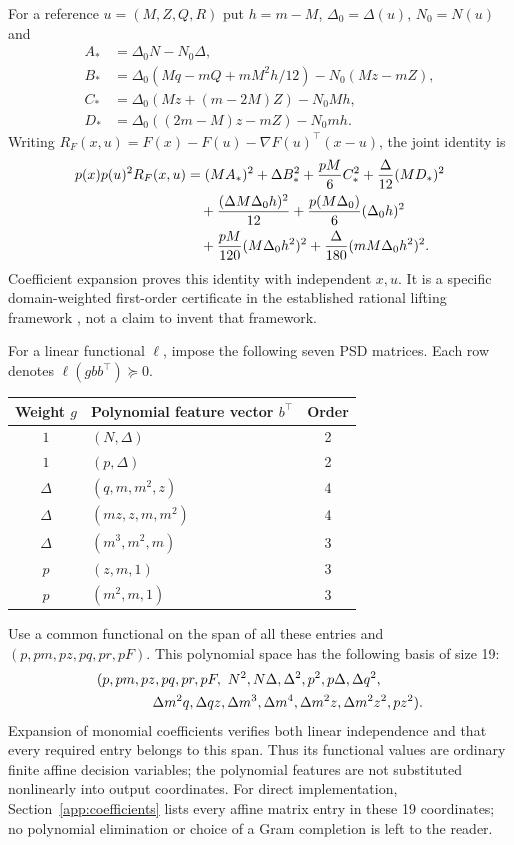 \documentclass[pdflatex,sn-mathphys-num]{sn-jnl}
\theoremstyle{thmstyleone}
\theoremstyle{thmstyletwo}\newtheorem{remark}[theorem]{Remark}
\begin{document}
For a reference $u=(M,Z,Q,R)$ put $h=m-M$, $\Delta_0=\Delta(u)$,
$N_0=N(u)$ and
\begin{align*}
 A_*&=\Delta_0N-N_0\Delta,\\
 B_*&=\Delta_0(Mq-mQ+mM^2h/12)-N_0(Mz-mZ),\\
 C_*&=\Delta_0(Mz+(m-2M)Z)-N_0Mh,\\
 D_*&=\Delta_0((2m-M)z-mZ)-N_0mh.
\end{align*}
Writing $R_F(x,u)=F(x)-F(u)-\nabla F(u)^\top(x-u)$, the joint identity is
\begingroup{}
\begin{align}
 p(x)p(u)^2R_F(x,u)
 &=(MA_*)^2+\Delta B_*^2+\frac{pM}{6}C_*^2
       +\frac{\Delta}{12}(MD_*)^2\notag\\
 &\quad+\frac{(\Delta M\Delta_0h)^2}{12}
       +\frac{p(M\Delta_0)}6(\Delta_0h)^2\notag\\
 &\quad+\frac{pM}{120}(M\Delta_0h^2)^2
       +\frac{\Delta}{180}(mM\Delta_0h^2)^2.\label{eq:five-certificate}
\end{align}
\endgroup
Coefficient expansion proves this identity with independent $x,u$. It is a
specific domain-weighted first-order certificate in the established rational
lifting framework \cite{nierational}, not a claim to invent that framework.

For a linear functional $\ell$, impose the following seven PSD matrices.
Each row denotes $\ell(gbb^\top)\succeq0$.
\begin{center}
\begin{tabular}{clc}
\toprule
Weight $g$ & Polynomial feature vector $b^\top$ & Order\\
\midrule
$1$ & $(N,\Delta)$ & 2\\
$1$ & $(p,\Delta)$ & 2\\
$\Delta$ & $(q,m,m^2,z)$ & 4\\
$\Delta$ & $(mz,z,m,m^2)$ & 4\\
$\Delta$ & $(m^3,m^2,m)$ & 3\\
$p$ & $(z,m,1)$ & 3\\
$p$ & $(m^2,m,1)$ & 3\\
\bottomrule
\end{tabular}
\end{center}
Use a common functional on the span of all these entries and
$(p,pm,pz,pq,pr,pF)$. This polynomial space has the following basis of size 19:
\begin{align*}
 &(p,pm,pz,pq,pr,pF,\ N^2,N\Delta,\Delta^2,p^2,p\Delta,\Delta q^2,\\
 &\hspace{14mm}\Delta m^2q,\Delta qz,\Delta m^3,\Delta m^4,
           \Delta m^2z,\Delta m^2z^2,pz^2).
\end{align*}
Expansion of monomial coefficients verifies both linear independence and
that every required entry belongs to this span. Thus its functional values
are ordinary finite affine decision variables; the polynomial features are
not substituted nonlinearly into output coordinates. For direct implementation,
Section~\ref{app:coefficients} lists every affine matrix entry in these
19 coordinates; no polynomial elimination or choice of a Gram completion is
left to the reader.
\end{document}
